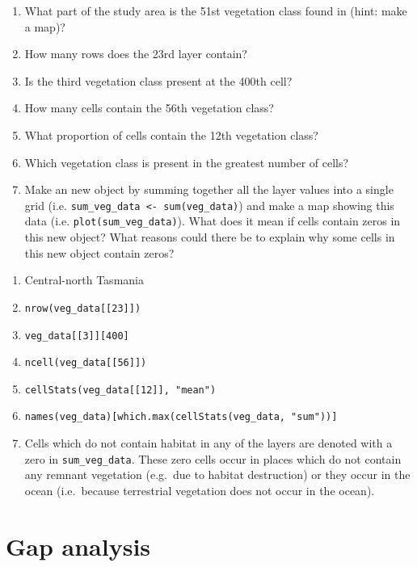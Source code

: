 \documentclass[12pt,]{book}
\providecommand{\tightlist}{%
  \setlength{\itemsep}{0pt}\setlength{\parskip}{0pt}}
\let\BeginKnitrBlock\begin \let\EndKnitrBlock\end
\begin{document}
\BeginKnitrBlock{rmdquestion}
\begin{enumerate}
\def\labelenumi{\arabic{enumi}.}
\tightlist
\item
  What part of the study area is the 51st vegetation class found in
  (hint: make a map)?
\item
  How many rows does the 23rd layer contain?
\item
  Is the third vegetation class present at the 400th cell?
\item
  How many cells contain the 56th vegetation class?
\item
  What proportion of cells contain the 12th vegetation class?
\item
  Which vegetation class is present in the greatest number of cells?
\item
  Make an new object by summing together all the layer values into a
  single grid (i.e.
  \texttt{sum\_veg\_data\ \textless{}-\ sum(veg\_data)}) and make a map
  showing this data (i.e. \texttt{plot(sum\_veg\_data)}). What does it
  mean if cells contain zeros in this new object? What reasons could
  there be to explain why some cells in this new object contain zeros?
\end{enumerate}
\EndKnitrBlock{rmdquestion}

\BeginKnitrBlock{rmdanswer}
\begin{enumerate}
\def\labelenumi{\arabic{enumi}.}
\tightlist
\item
  Central-north Tasmania
\item
  \texttt{nrow(veg\_data{[}{[}23{]}{]})}
\item
  \texttt{veg\_data{[}{[}3{]}{]}{[}400{]}}
\item
  \texttt{ncell(veg\_data{[}{[}56{]}{]})}
\item
  \texttt{cellStats(veg\_data{[}{[}12{]}{]},\ "mean")}
\item
  \texttt{names(veg\_data){[}which.max(cellStats(veg\_data,\ "sum")){]}}
\item
  Cells which do not contain habitat in any of the layers are denoted
  with a zero in \texttt{sum\_veg\_data}. These zero cells occur in
  places which do not contain any remnant vegetation (e.g.~due to
  habitat destruction) or they occur in the ocean (i.e.~because
  terrestrial vegetation does not occur in the ocean).
\end{enumerate}
\EndKnitrBlock{rmdanswer}

\chapter{Gap analysis}\label{gap-analysis}
\end{document}
